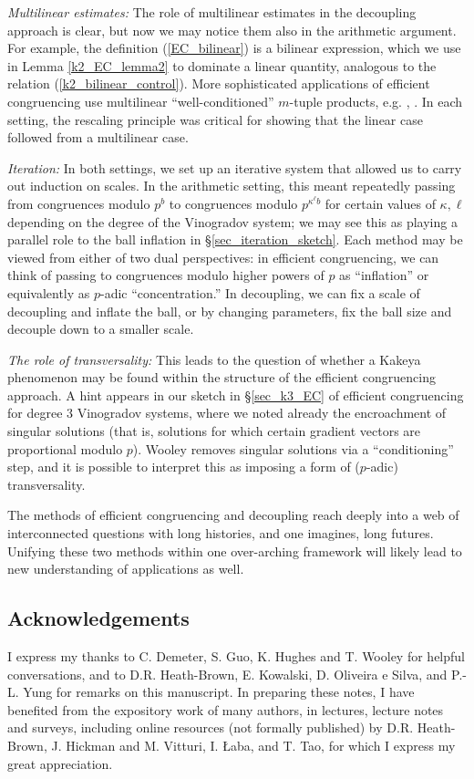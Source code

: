 \documentclass[brochure,english,12pt]{bourbaki}%
\begin{document}
\emph{Multilinear estimates:}
The role of multilinear estimates in the decoupling approach is clear, but now we may notice them also in the arithmetic argument. For example, the definition (\ref{EC_bilinear}) is a bilinear expression, which we use in Lemma \ref{k2_EC_lemma2} to dominate a linear quantity, analogous to the relation (\ref{k2_bilinear_control}). More sophisticated applications of efficient congruencing use multilinear ``well-conditioned'' $m$-tuple products, e.g. \cite[Eqn 3.3.]{Woo12a}, \cite[Eqn 2.18--2.20]{Woo17b}. In each setting, the rescaling principle was critical for showing that the linear case followed from a multilinear case.

\emph{Iteration:} In both settings, we set up an iterative system that allowed us to carry out induction on scales.
In the arithmetic setting, this meant repeatedly passing from congruences modulo $p^b$ to congruences modulo $p^{\kappa^\ell b}$ for certain values of $\kappa,\ell$ depending on the degree of the Vinogradov system; we may see this as playing a parallel role to the ball inflation in \S \ref{sec_iteration_sketch}. Each method may be viewed from either of two dual perspectives: in efficient congruencing, we can think of passing to congruences modulo higher powers of $p$ as  ``inflation'' or equivalently as $p$-adic ``concentration.'' In decoupling, we can fix a scale of decoupling and inflate the ball, or by changing parameters, fix the ball size and decouple down to a smaller scale.


\emph{The role of transversality:} This leads to the question of whether a Kakeya phenomenon may be found within the structure of the efficient congruencing approach. A hint appears in our sketch in \S \ref{sec_k3_EC} of efficient congruencing for degree 3 Vinogradov systems, where we noted already the encroachment of singular solutions (that is, solutions for which certain gradient vectors are proportional modulo $p$). Wooley removes singular solutions via a ``conditioning'' step, and it is possible to interpret this as imposing a form of ($p$-adic) transversality.



The methods of efficient congruencing and decoupling reach deeply into a web of interconnected questions with long histories, and one imagines, long futures. Unifying these two methods within one over-arching framework will likely lead to new understanding of applications as well. 


\subsection*{Acknowledgements}
 I express my thanks to C. Demeter, S. Guo, K. Hughes and T. Wooley  for helpful conversations, and to D.R. Heath-Brown, E. Kowalski, D. Oliveira e Silva, and P.-L. Yung for remarks on this manuscript.  In preparing these notes,  I have benefited from the expository work of many authors, in lectures, lecture notes and surveys, including online resources (not formally published) by D.R. Heath-Brown, J. Hickman and M. Vitturi, I. {\L}aba, and T. Tao, for which I express my great appreciation.
\end{document}
